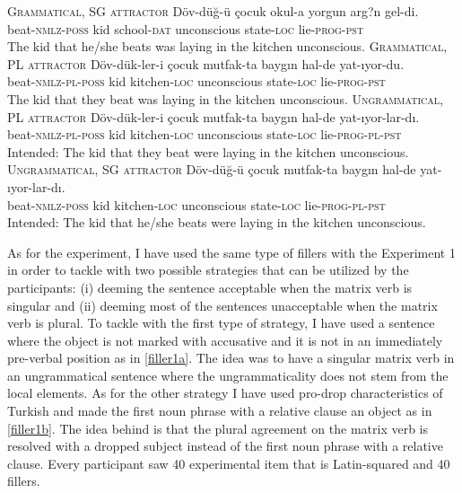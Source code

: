 \documentclass[english,doc]{apa6}
\begin{document}
\begin{exe}
\ex \label{prereg1}
  \begin{xlist}
  \ex \textsc{Grammatical, SG attractor} \label{reg1}
      \gll Döv-düğ-ü çocuk okul-a yorgun arg?n gel-di.\\
  beat-\textsc{nmlz}-\textsc{poss} kid school-\textsc{dat} unconscious state-\textsc{loc} lie-\textsc{prog}-\textsc{pst}\\ 
      \glt The kid that he/she beats was laying in the kitchen unconscious.
  \ex \textsc{Grammatical, PL attractor} \label{reg2}
      \gll Döv-dük-ler-i çocuk mutfak-ta baygın hal-de yat-ıyor-du.\\
  beat-\textsc{nmlz}-\textsc{pl}-\textsc{poss} kid kitchen-\textsc{loc} unconscious state-\textsc{loc} lie-\textsc{prog}-\textsc{pst}\\
      \glt The kid that they beat was laying in the kitchen unconscious.
  \ex \textsc{Ungrammatical, PL attractor} \label{reg3}
      \gll Döv-dük-ler-i çocuk mutfak-ta baygın hal-de yat-ıyor-lar-dı.\\
  beat-\textsc{nmlz}-\textsc{pl}-\textsc{poss} kid kitchen-\textsc{loc} unconscious state-\textsc{loc} lie-\textsc{prog}-\textsc{pl}-\textsc{pst}\\
      \glt Intended: The kid that they beat were laying in the kitchen unconscious.
  \ex \textsc{Ungrammatical, SG attractor} \label{reg4}
      \gll Döv-düğ-ü çocuk mutfak-ta baygın hal-de yat-ıyor-lar-dı.\\
  beat-\textsc{nmlz}-\textsc{poss} kid kitchen-\textsc{loc} unconscious state-\textsc{loc} lie-\textsc{prog}-\textsc{pl}-\textsc{pst}\\
      \glt Intended: The kid that he/she beats were laying in the kitchen unconscious.
  \end{xlist}
\end{exe}

As for the experiment, I have used the same type of fillers with the Experiment 1 in order to tackle with two possible strategies that can be utilized by the participants: (i) deeming the sentence acceptable when the matrix verb is singular and (ii) deeming most of the sentences unacceptable when the matrix verb is plural. To tackle with the first type of strategy, I have used a sentence where the object is not marked with accusative and it is not in an immediately pre-verbal position as in \autoref{filler1a}. The idea was to have a singular matrix verb in an ungrammatical sentence where the ungrammaticality does not stem from the local elements. As for the other strategy I have used pro-drop characteristics of Turkish and made the first noun phrase with a relative clause an object as in \autoref{filler1b}. The idea behind is that the plural agreement on the matrix verb is resolved with a dropped subject instead of the first noun phrase with a relative clause. Every participant saw 40 experimental item that is Latin-squared and 40 fillers.
\end{document}
